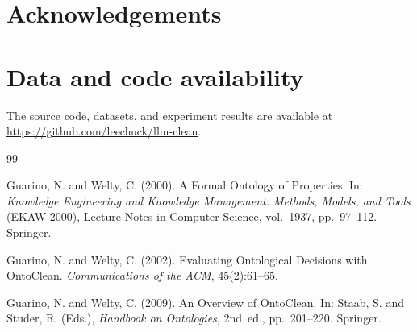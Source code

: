 \documentclass{IOS-Book-Article}
\begin{document}
\section*{Acknowledgements}

\section*{Data and code availability}
The source code, datasets, and experiment results are available at
\url{https://github.com/leechuck/llm-clean}.

\begin{thebibliography}{99}

  Guarino, N. and Welty, C. (2000).
  A Formal Ontology of Properties.
  In: \textit{Knowledge Engineering and Knowledge Management: Methods,
    Models, and Tools} (EKAW 2000), Lecture Notes in Computer Science,
  vol.~1937, pp.~97--112. Springer.

  Guarino, N. and Welty, C. (2002).
  Evaluating Ontological Decisions with OntoClean.
  \textit{Communications of the ACM}, 45(2):61--65.

  Guarino, N. and Welty, C. (2009).
  An Overview of OntoClean.
  In: Staab, S. and Studer, R. (Eds.), \textit{Handbook on Ontologies},
  2nd~ed., pp.~201--220. Springer.




\end{thebibliography}
\end{document}
